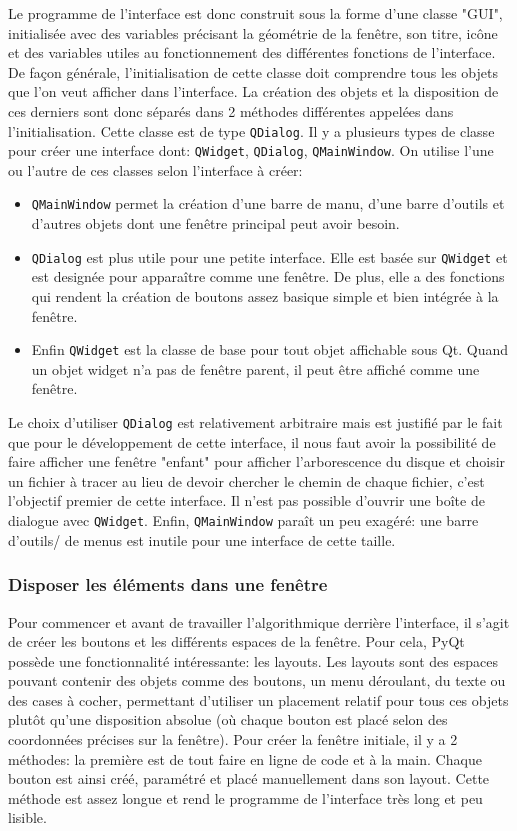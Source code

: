 \documentclass[a4paper,11pt]{article}
\begin{document}
Le programme de l'interface est donc construit sous la forme d'une classe "GUI", initialisée avec des variables précisant la géométrie de la fenêtre, son titre, icône et des variables utiles au fonctionnement des différentes fonctions de l'interface. De façon générale, l'initialisation de cette classe doit comprendre tous les objets que l'on veut afficher dans l'interface. La création des objets et la disposition de ces derniers sont donc séparés dans 2 méthodes différentes appelées dans l'initialisation. Cette classe est de type \verb|QDialog|. Il y a plusieurs types de classe pour créer une interface dont: \verb|QWidget|, \verb|QDialog|, \verb|QMainWindow|. On utilise l'une ou l'autre de ces classes selon l'interface à créer: 
\begin{itemize}
	\item \verb|QMainWindow| permet la création d'une barre de manu, d'une barre d'outils et d'autres objets dont une fenêtre principal peut avoir besoin.
	\item \verb|QDialog| est plus utile pour une petite interface. Elle est basée sur \verb|QWidget| et est designée pour apparaître comme une fenêtre. De plus, elle a des fonctions qui rendent la création de boutons assez basique simple et bien intégrée à la fenêtre.
	\item Enfin \verb|QWidget| est la classe de base pour tout objet affichable sous Qt. Quand un objet widget n'a pas de fenêtre parent, il peut être affiché comme une fenêtre. 
\end{itemize}

Le choix d'utiliser \verb|QDialog| est relativement arbitraire mais est justifié par le fait que pour le développement de cette interface, il nous faut avoir la possibilité de faire afficher une fenêtre "enfant" pour afficher l'arborescence du disque et choisir un fichier à tracer au lieu de devoir chercher le chemin de chaque fichier, c'est l'objectif premier de cette interface. Il n'est pas possible d'ouvrir une boîte de dialogue avec \verb|QWidget|. Enfin, \verb|QMainWindow| paraît un peu exagéré: une barre d'outils/ de menus est inutile pour une interface de cette taille.

\subsubsection{Disposer les éléments dans une fenêtre}

Pour commencer et avant de travailler l'algorithmique derrière l'interface, il s'agit de créer les boutons et les différents espaces de la fenêtre. Pour cela, PyQt possède une fonctionnalité intéressante: les layouts. Les layouts sont des espaces pouvant contenir des objets comme des boutons, un menu déroulant, du texte ou des cases à cocher, permettant d'utiliser un placement relatif pour tous ces objets plutôt qu'une disposition absolue (où chaque bouton est placé selon des coordonnées précises sur la fenêtre). Pour créer la fenêtre initiale, il y a 2 méthodes: la première est de tout faire en ligne de code et à la main. Chaque bouton est ainsi créé, paramétré et placé manuellement dans son layout. Cette méthode est assez longue et rend le programme de l'interface très long et peu lisible. 
\end{document}
